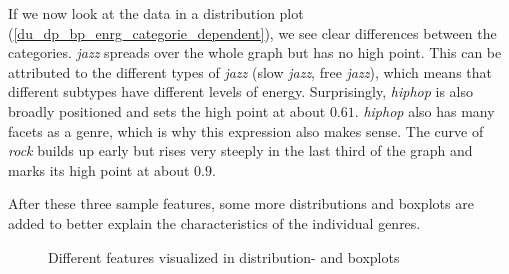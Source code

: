 If we now look at the data in a distribution plot (\ref{du_dp_bp_enrg_categorie_dependent}),
we see clear differences between the categories.
\emph{jazz} spreads over the whole graph but has no high point.
This can be attributed to the different types of \emph{jazz} (slow \emph{jazz}, free \emph{jazz}),
which means that different subtypes have different levels of energy.
Surprisingly, \emph{hiphop} is also broadly positioned and sets the high point at about \(0.61\).
\emph{hiphop} also has many facets as a genre, which is why this expression also makes sense.
The curve of \emph{rock} builds up early but rises very steeply in the last third of the graph and marks
its high point at about \(0.9\). 

After these three sample features, some more distributions and boxplots are added to better
explain the characteristics of the individual genres.

\begin{figure}[H]
    \centering
    \qquad
    \qquad
    \label{fig:du_ds_bp_speechiness}%
\end{figure}

\begin{figure}[H]
    \centering
    \qquad
    \qquad
    \label{fig:du_ds_bp_danceability}%
\end{figure}

\begin{figure}[H]
    \centering
    \qquad
    \qquad
    \label{fig:du_ds_bp_accousticness}%
\end{figure}

\begin{figure}[H]
    \centering
    \qquad
    \qquad
    \caption{Different features visualized in distribution- and boxplots}%
    \label{fig:du_ds_bp_valence}%
\end{figure}